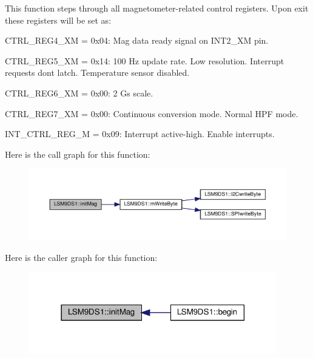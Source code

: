 This function steps through all magnetometer-\/related control registers. Upon exit these registers will be set as\+:
\begin{DoxyItemize}
\item C\+T\+R\+L\+\_\+\+R\+E\+G4\+\_\+\+XM = 0x04\+: Mag data ready signal on I\+N\+T2\+\_\+\+XM pin.
\item C\+T\+R\+L\+\_\+\+R\+E\+G5\+\_\+\+XM = 0x14\+: 100 Hz update rate. Low resolution. Interrupt requests don\textquotesingle{}t latch. Temperature sensor disabled.
\item C\+T\+R\+L\+\_\+\+R\+E\+G6\+\_\+\+XM = 0x00\+: 2 Gs scale.
\item C\+T\+R\+L\+\_\+\+R\+E\+G7\+\_\+\+XM = 0x00\+: Continuous conversion mode. Normal H\+PF mode.
\item I\+N\+T\+\_\+\+C\+T\+R\+L\+\_\+\+R\+E\+G\+\_\+M = 0x09\+: Interrupt active-\/high. Enable interrupts. 
\end{DoxyItemize}Here is the call graph for this function\+:
\nopagebreak
\begin{figure}[H]
\begin{center}
\leavevmode
\includegraphics[width=350pt]{classLSM9DS1_a492aa6edcf891f273d932636e3cc470d_cgraph}
\end{center}
\end{figure}
Here is the caller graph for this function\+:
\nopagebreak
\begin{figure}[H]
\begin{center}
\leavevmode
\includegraphics[width=306pt]{classLSM9DS1_a492aa6edcf891f273d932636e3cc470d_icgraph}
\end{center}
\end{figure}
\mbox{\label{classLSM9DS1_a4286d5803ab028c657e007ae99acc60a}} 
